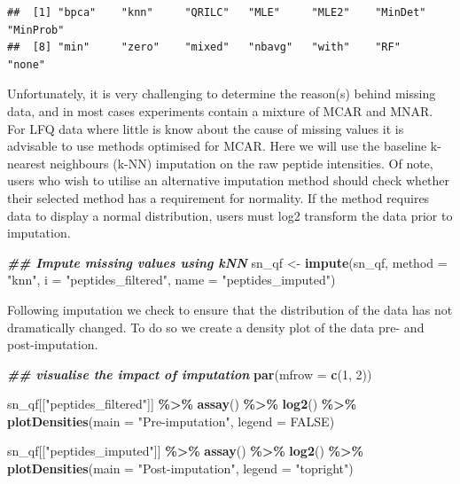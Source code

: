 \documentclass[9pt,a4paper,]{extarticle}
\newenvironment{Shaded}{\begin{snugshade}}{\end{snugshade}}
\newcommand{\AttributeTok}[1]{\textcolor[rgb]{0.13,0.29,0.53}{#1}}
\newcommand{\ConstantTok}[1]{\textcolor[rgb]{0.56,0.35,0.01}{#1}}
\newcommand{\DecValTok}[1]{\textcolor[rgb]{0.00,0.00,0.81}{#1}}
\newcommand{\DocumentationTok}[1]{\textcolor[rgb]{0.56,0.35,0.01}{\textbf{\textit{#1}}}}
\newcommand{\FunctionTok}[1]{\textcolor[rgb]{0.13,0.29,0.53}{\textbf{#1}}}
\newcommand{\NormalTok}[1]{#1}
\newcommand{\OtherTok}[1]{\textcolor[rgb]{0.56,0.35,0.01}{#1}}
\newcommand{\SpecialCharTok}[1]{\textcolor[rgb]{0.81,0.36,0.00}{\textbf{#1}}}
\newcommand{\StringTok}[1]{\textcolor[rgb]{0.31,0.60,0.02}{#1}}
\begin{document}
\begin{verbatim}
##  [1] "bpca"    "knn"     "QRILC"   "MLE"     "MLE2"    "MinDet"  "MinProb"
##  [8] "min"     "zero"    "mixed"   "nbavg"   "with"    "RF"      "none"
\end{verbatim}

Unfortunately, it is very challenging to determine the reason(s) behind missing
data, and in most cases experiments contain a mixture of MCAR and MNAR. For LFQ
data where little is know about the cause of missing values it is advisable to
use methods optimised for MCAR. Here we will use the baseline k-nearest
neighbours (k-NN) imputation on the raw peptide intensities. Of note, users who
wish to utilise an alternative imputation method should check whether their
selected method has a requirement for normality. If the method requires data to
display a normal distribution, users must log2 transform the data prior to
imputation.

\begin{Shaded}
\begin{Highlighting}[]
\DocumentationTok{\#\# Impute missing values using kNN}
\NormalTok{sn\_qf }\OtherTok{\textless{}{-}} \FunctionTok{impute}\NormalTok{(sn\_qf,}
                \AttributeTok{method =} \StringTok{"knn"}\NormalTok{, }
                \AttributeTok{i =} \StringTok{"peptides\_filtered"}\NormalTok{,}
                \AttributeTok{name =} \StringTok{"peptides\_imputed"}\NormalTok{)}
\end{Highlighting}
\end{Shaded}

Following imputation we check to ensure that the distribution of the data has
not dramatically changed. To do so we create a density plot of the data pre- and
post-imputation.

\begin{Shaded}
\begin{Highlighting}[]
\DocumentationTok{\#\# visualise the impact of imputation}
\FunctionTok{par}\NormalTok{(}\AttributeTok{mfrow =} \FunctionTok{c}\NormalTok{(}\DecValTok{1}\NormalTok{, }\DecValTok{2}\NormalTok{))}

\NormalTok{sn\_qf[[}\StringTok{"peptides\_filtered"}\NormalTok{]] }\SpecialCharTok{\%\textgreater{}\%}
  \FunctionTok{assay}\NormalTok{() }\SpecialCharTok{\%\textgreater{}\%}
  \FunctionTok{log2}\NormalTok{() }\SpecialCharTok{\%\textgreater{}\%}
  \FunctionTok{plotDensities}\NormalTok{(}\AttributeTok{main =} \StringTok{"Pre{-}imputation"}\NormalTok{,}
                \AttributeTok{legend =} \ConstantTok{FALSE}\NormalTok{)}

\NormalTok{sn\_qf[[}\StringTok{"peptides\_imputed"}\NormalTok{]] }\SpecialCharTok{\%\textgreater{}\%}
  \FunctionTok{assay}\NormalTok{() }\SpecialCharTok{\%\textgreater{}\%}
  \FunctionTok{log2}\NormalTok{() }\SpecialCharTok{\%\textgreater{}\%}
  \FunctionTok{plotDensities}\NormalTok{(}\AttributeTok{main =} \StringTok{"Post{-}imputation"}\NormalTok{,}
                \AttributeTok{legend =} \StringTok{"topright"}\NormalTok{)}
\end{Highlighting}
\end{Shaded}
\end{document}
